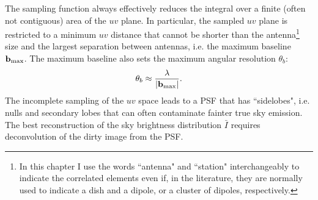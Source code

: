 The sampling function always effectively reduces the integral over a finite (often not contiguous) area of the $uv$ plane. In particular, the sampled $uv$ plane is restricted to a minimum $uv$ distance that cannot be shorter than the antenna\footnote{In this chapter I use the words ``antenna" and ``station" interchangeably to indicate the correlated elements even if, in the literature, they are normally used to indicate a dish and a dipole, or a cluster of dipoles, respectively.} size and the largest separation between antennas, i.e. the maximum baseline ${\bf b}_{\rm max}$. The maximum baseline also sets the maximum angular resolution $\theta_b$:
\begin{equation}
\theta_b \approx \frac{\lambda}{|{\bf b}_{\rm max}|}.
\label{eq:8}
\end{equation}
The incomplete sampling of the $uv$ space leads to a PSF that has ``sidelobes", i.e. nulls and secondary lobes that can often contaminate fainter true sky emission. The best reconstruction of the sky brightness distribution ${\bar I}$ requires deconvolution of the dirty image from the PSF. 

